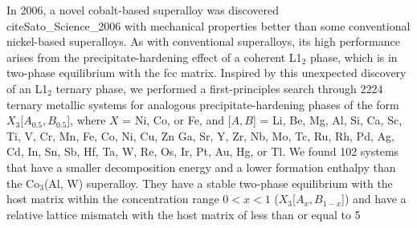 In 2006, a novel cobalt-based superalloy was discovered~\\cite{Sato_Science_2006} with mechanical properties better than some conventional nickel-based superalloys. As with conventional superalloys, its high performance arises from the precipitate-hardening effect of a coherent L1$_{2}$ phase, which is in two-phase equilibrium with the fcc matrix. Inspired by this unexpected discovery of an L1$_{2}$ ternary phase, we performed a first-principles search through 2224 ternary metallic systems for analogous precipitate-hardening phases of the form $X_{3}$[$A_{0.5}, B_{0.5}$], where $X$ = Ni, Co, or Fe, and [$A,B$] = Li, Be, Mg, Al, Si, Ca, Sc, Ti, V, Cr, Mn, Fe, Co, Ni, Cu, Zn Ga, Sr, Y, Zr, Nb, Mo, Tc, Ru, Rh, Pd, Ag, Cd, In, Sn, Sb, Hf, Ta, W, Re, Os, Ir, Pt, Au, Hg, or Tl. We found 102 systems that have a smaller decomposition energy and a lower formation enthalpy than the Co$_{3}$(Al, W) superalloy. They have a stable two-phase equilibrium with the host matrix within the concentration range $0<x<1$ ($X_{3}$[$A_{x}, B_{1-x}$]) and have a relative lattice mismatch with the host matrix of less than or equal to 5\\%
